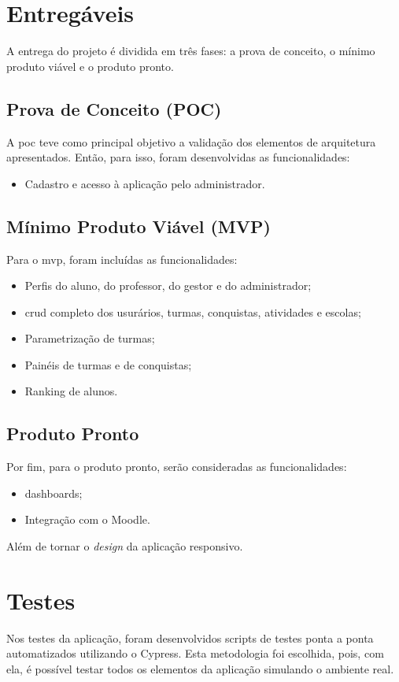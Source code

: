 \documentclass[
    12pt,               %
    openright,          %
    oneside,
    a4paper,            %
    english,            %
    brazil              %
    ]{ifsp-spo-inf-ctds} %
\begin{document}

\section{Entregáveis}
A entrega do projeto é dividida em três fases: a prova de conceito, o mínimo produto viável e o produto pronto.

\subsection{Prova de Conceito (POC)}
A \ac{poc} teve como principal objetivo a validação dos elementos de arquitetura apresentados. Então, para isso, foram desenvolvidas as funcionalidades:
 \begin{itemize}
     \item Cadastro e acesso à aplicação pelo administrador.
 \end{itemize}

\subsection{Mínimo Produto Viável (MVP)}
Para o \ac{mvp}, foram incluídas as funcionalidades:
\begin{itemize}
    \item Perfis do aluno, do professor, do gestor e do administrador;
    \item \ac{crud} completo dos usurários, turmas, conquistas, atividades e escolas;
    \item Parametrização de turmas;
    \item Painéis de turmas e de conquistas;
    \item Ranking de alunos.
\end{itemize}

\subsection{Produto Pronto}
Por fim, para o produto pronto, serão consideradas as funcionalidades:

\begin{itemize}
    \item \glspl{dashboard};
    \item Integração com o Moodle.
\end{itemize}

Além de tornar o \textit{design} da aplicação responsivo.

\section{Testes}
Nos testes da aplicação, foram desenvolvidos scripts de testes ponta a ponta automatizados utilizando o Cypress. Esta metodologia foi escolhida, pois, com ela, é possível testar todos os elementos da aplicação simulando o ambiente real. 
\end{document}
